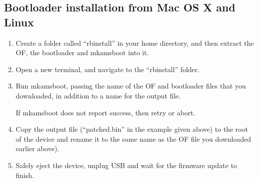 \subsection{Bootloader installation from Mac OS X and Linux}

\begin{enumerate}

\item Create a folder called ``rbinstall'' in your home directory, and then
  extract the OF, the bootloader and mkamsboot into it.

\item Open a new terminal, and navigate to the ``rbinstall'' folder.

\item Run mkamsboot, passing the name of the OF and bootloader files that
  you downloaded, in addition to a name for the output file.

  \begin{code} 
  \end{code}
 
  If mkamsboot does not report success, then retry or abort.

\item Copy the output file (``patched.bin'' in the example given above) to the
  root of the device and rename it to the same name as the OF file you downloaded earlier 
    above).

\item Safely eject the device, unplug USB and wait for the firmware update to finish.
\end{enumerate}
